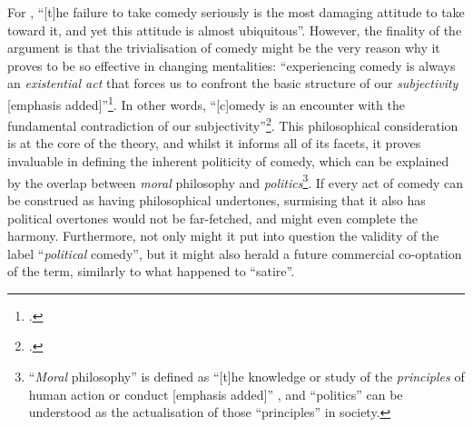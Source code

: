 \documentclass[
,a4paper
,DIV=12
,12pt
,abstract
,bibliography=totoc
]{scrartcl}
\begin{document}
For \textcite[179]{mcgowan2017}, \enquote{[t]he failure to take comedy seriously is the most damaging attitude to take toward it, and yet this attitude is almost ubiquitous}.  However, the finality of the argument is that the trivialisation of comedy might be the very reason why it proves to be so effective in changing mentalities: \enquote{experiencing comedy is always an \emph{existential act} that forces us to confront the basic structure of our \emph{subjectivity} [emphasis added]}\footnote{\Cite[179]{mcgowan2017}.}.  In other words, \enquote{[c]omedy is an encounter with the fundamental contradiction of our subjectivity}\footnote{\Cite[181]{mcgowan2017}.}.  This philosophical consideration is at the core of the theory, and whilst it informs all of its facets, it proves invaluable in defining the inherent politicity of comedy, which can be explained by the overlap between \emph{moral} philosophy and \emph{politics}\footnote{\enquote{\emph{Moral} philosophy} is defined as \enquote{[t]he knowledge or study of the \emph{principles} of human action or conduct [emphasis added]} \parencite{oed-philosophy}, and \enquote{politics} can be understood as the actualisation of those \enquote{principles} in society.}.  If every act of comedy can be construed as having philosophical undertones, surmising that it also has political overtones would not be far-fetched, and might even complete the harmony.  Furthermore, not only might it put into question the validity of the label \enquote{\emph{political} comedy}, but it might also herald a future commercial co-optation of the term, similarly to what happened to \enquote{satire}.
\end{document}
